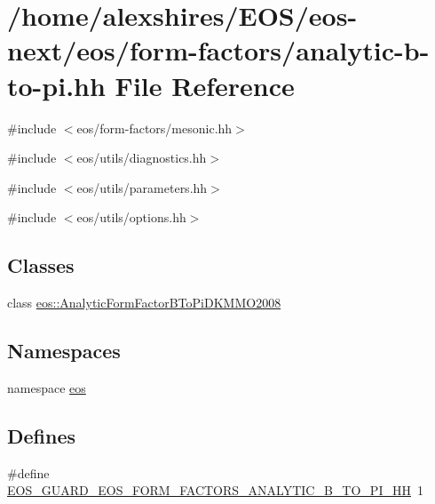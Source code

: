 \hypertarget{analytic-b-to-pi_8hh}{
\section{/home/alexshires/EOS/eos-\/next/eos/form-\/factors/analytic-\/b-\/to-\/pi.hh File Reference}
\label{analytic-b-to-pi_8hh}
}
{\ttfamily \#include $<$eos/form-\/factors/mesonic.hh$>$}\par
{\ttfamily \#include $<$eos/utils/diagnostics.hh$>$}\par
{\ttfamily \#include $<$eos/utils/parameters.hh$>$}\par
{\ttfamily \#include $<$eos/utils/options.hh$>$}\par
\subsection*{Classes}
\begin{DoxyCompactItemize}
\item 
class \hyperlink{classeos_1_1AnalyticFormFactorBToPiDKMMO2008}{eos::AnalyticFormFactorBToPiDKMMO2008}
\end{DoxyCompactItemize}
\subsection*{Namespaces}
\begin{DoxyCompactItemize}
\item 
namespace \hyperlink{namespaceeos}{eos}
\end{DoxyCompactItemize}
\subsection*{Defines}
\begin{DoxyCompactItemize}
\item 
\#define \hyperlink{analytic-b-to-pi_8hh_a2cbc4c680b544546e7a23f8c3738fe53}{EOS\_\-GUARD\_\-EOS\_\-FORM\_\-FACTORS\_\-ANALYTIC\_\-B\_\-TO\_\-PI\_\-HH}~1
\end{DoxyCompactItemize}


